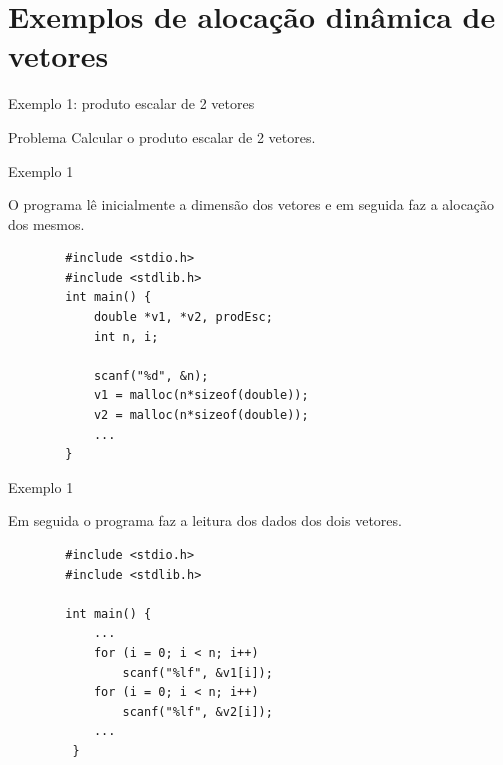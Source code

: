\documentclass[handout]{beamer}
\begin{document}
\section{Exemplos de alocação dinâmica de vetores}

\begin{frame}[fragile]{Exemplo 1: produto escalar de 2 vetores}

    \begin{block}{Problema}
        Calcular o produto escalar de 2 vetores.
    \end{block}

\end{frame}

\begin{frame}[fragile]{Exemplo 1}

    O programa lê inicialmente a dimensão dos vetores e em seguida faz a alocação dos mesmos.
  
    \begin{verbatim}
        #include <stdio.h>
        #include <stdlib.h>
        int main() {
            double *v1, *v2, prodEsc;
            int n, i;

            scanf("%d", &n);
            v1 = malloc(n*sizeof(double));
            v2 = malloc(n*sizeof(double));
            ...
        }
    \end{verbatim}

\end{frame}

\begin{frame}[fragile]{Exemplo 1}
 
    Em seguida o programa faz a leitura dos dados dos dois vetores.

    \begin{verbatim}
        #include <stdio.h>
        #include <stdlib.h>

        int main() {
            ...
            for (i = 0; i < n; i++)
                scanf("%lf", &v1[i]);
            for (i = 0; i < n; i++)
                scanf("%lf", &v2[i]);
            ...
         }
    \end{verbatim}

\end{frame}
\end{document}
